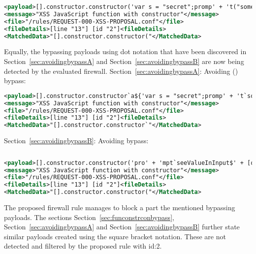 \begin{lstlisting}[style=ruleStyle, language=XML, caption=function constructor bypass payload using dot notation blocked, label={lst:constructorsblockedpoc}]
<payload>[].constructor.constructor('var s = "secret";promp' + 't("something", s)')()</payload>
<message>"XSS JavaScript function with constructor"</message>
<file>"/rules/REQUEST-000-XSS-PROPOSAL.conf"</file>
<fileDetails>[line "13"] [id "2"]<fileDetails>
<MatchedData>"[].constructor.constructor("</MatchedData>
\end{lstlisting}

Equally, the bypassing payloads using dot notation that have been discovered in Section~\ref{sec:avoidingbypassA} and  Section~\ref{sec:avoidingbypassB} are now being detected by the evaluated firewall. Section~\ref{sec:avoidingbypassA}: Avoiding () bypass:

\begin{lstlisting}[style=ruleStyle, language=XML, caption=avoiding () bypass payload using dot notation blocked, label={lst:constructorsblockedpoc}]
<payload>[].constructor.constructor`a${'var s = "secret";promp' + 't`something\u{0024}{s}`'}```</payload>
<message>"XSS JavaScript function with constructor"</message>
<file>"/rules/REQUEST-000-XSS-PROPOSAL.conf"</file>
<fileDetails>[line "13"] [id "2"]<fileDetails>
<MatchedData>"[].constructor.constructor`"</MatchedData>
\end{lstlisting}

Section~\ref{sec:avoidingbypassB}: Avoiding {} bypass:

\begin{lstlisting}[style=basicStyle, caption=avoiding {} bypass payload using dot notation, label={lst:stringreplacepass}]
\end{lstlisting}
\begin{lstlisting}[style=ruleStyle, language=XML, caption=using constructors rule poc, label={lst:constructorsblockedpoc}]
<payload>[].constructor.constructor('pro' + 'mpt`seeValueInInput$' + [open + []][0][16] + '2+2' + [open + []][0][36] + ':`')();</payload>
<message>"XSS JavaScript function with constructor"</message>
<file>"/rules/REQUEST-000-XSS-PROPOSAL.conf"</file>
<fileDetails>[line "13"] [id "2"]<fileDetails>
<MatchedData>"[].constructor.constructor("</MatchedData>
\end{lstlisting}

The proposed firewall rule manages to block a part the mentioned bypassing payloads. The sections Section~\ref{sec:funconstrconbypass}, Section~\ref{sec:avoidingbypassA} and Section~\ref{sec:avoidingbypassB} further state similar payloads created using the square bracket notation. These are not detected and filtered by the proposed rule with id:2.

